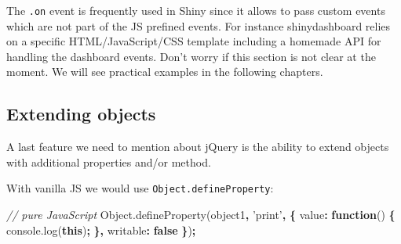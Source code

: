 \documentclass[]{book}
\newenvironment{Shaded}{\begin{snugshade}}{\end{snugshade}}
\newcommand{\AttributeTok}[1]{\textcolor[rgb]{0.77,0.63,0.00}{#1}}
\newcommand{\CommentTok}[1]{\textcolor[rgb]{0.56,0.35,0.01}{\textit{#1}}}
\newcommand{\DataTypeTok}[1]{\textcolor[rgb]{0.13,0.29,0.53}{#1}}
\newcommand{\DecValTok}[1]{\textcolor[rgb]{0.00,0.00,0.81}{#1}}
\newcommand{\KeywordTok}[1]{\textcolor[rgb]{0.13,0.29,0.53}{\textbf{#1}}}
\newcommand{\NormalTok}[1]{#1}
\newcommand{\OperatorTok}[1]{\textcolor[rgb]{0.81,0.36,0.00}{\textbf{#1}}}
\newcommand{\StringTok}[1]{\textcolor[rgb]{0.31,0.60,0.02}{#1}}
\newcommand{\VariableTok}[1]{\textcolor[rgb]{0.00,0.00,0.00}{#1}}
\begin{document}
The \texttt{.on} event is frequently used in Shiny since it allows to pass custom events which are not part of the JS prefined events. For instance shinydashboard relies on a specific HTML/JavaScript/CSS template including a homemade API for handling the dashboard events. Don't worry if this section is not clear at the moment. We will see practical examples in the following chapters.

\hypertarget{extending-objects}{%
\subsection{Extending objects}\label{extending-objects}}

A last feature we need to mention about jQuery is the ability to extend objects with additional properties and/or method.

\begin{Shaded}
\end{Shaded}

With vanilla JS we would use \texttt{Object.defineProperty}:

\begin{Shaded}
\begin{Highlighting}[]
\CommentTok{// pure JavaScript}
\VariableTok{Object}\NormalTok{.}\AttributeTok{defineProperty}\NormalTok{(object1}\OperatorTok{,} \StringTok{'print'}\OperatorTok{,} \OperatorTok{\{}
  \DataTypeTok{value}\OperatorTok{:} \KeywordTok{function}\NormalTok{() }\OperatorTok{\{}
    \VariableTok{console}\NormalTok{.}\AttributeTok{log}\NormalTok{(}\KeywordTok{this}\NormalTok{)}\OperatorTok{;}
  \OperatorTok{\},}
  \DataTypeTok{writable}\OperatorTok{:} \KeywordTok{false}
\OperatorTok{\}}\NormalTok{)}\OperatorTok{;}
\end{Highlighting}
\end{Shaded}
\end{document}
